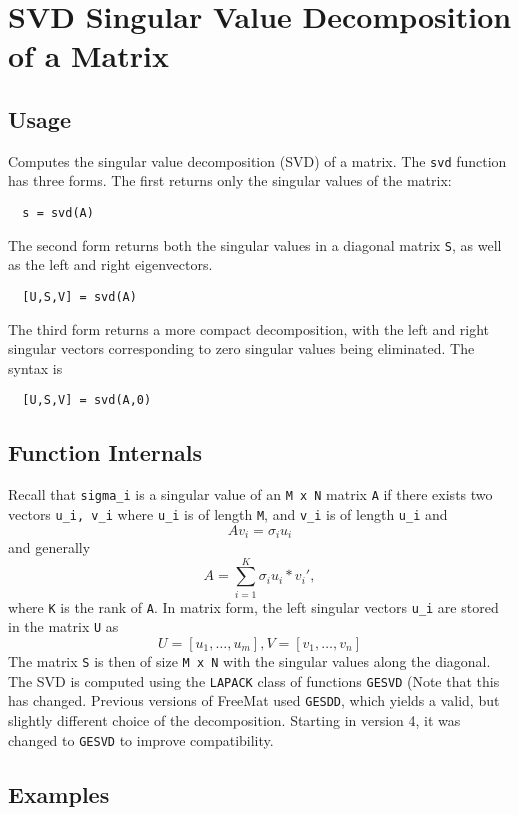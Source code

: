 \section{SVD Singular Value Decomposition of a Matrix}

\subsection{Usage}

Computes the singular value decomposition (SVD) of a matrix.  The 
\verb|svd| function has three forms.  The first returns only the singular
values of the matrix:
\begin{verbatim}
  s = svd(A)
\end{verbatim}
The second form returns both the singular values in a diagonal
matrix \verb|S|, as well as the left and right eigenvectors.
\begin{verbatim}
  [U,S,V] = svd(A)
\end{verbatim}
The third form returns a more compact decomposition, with the
left and right singular vectors corresponding to zero singular
values being eliminated.  The syntax is
\begin{verbatim}
  [U,S,V] = svd(A,0)
\end{verbatim}
\subsection{Function Internals}

Recall that \verb|sigma_i| is a singular value of an \verb|M x N|
matrix \verb|A| if there exists two vectors \verb|u_i, v_i| where \verb|u_i| is
of length \verb|M|, and \verb|v_i| is of length \verb|u_i| and
\[
  A v_i = \sigma_i u_i
\]
and generally
\[
  A = \sum_{i=1}^{K} \sigma_i u_i*v_i',
\]
where \verb|K| is the rank of \verb|A|.  In matrix form, the left singular
vectors \verb|u_i| are stored in the matrix \verb|U| as
\[
  U = [u_1,\ldots,u_m], V = [v_1,\ldots,v_n]
\]
The matrix \verb|S| is then of size \verb|M x N| with the singular
values along the diagonal.  The SVD is computed using the 
\verb|LAPACK| class of functions \verb|GESVD| (Note that this has
changed.  Previous versions of FreeMat used \verb|GESDD|, which
yields a valid, but slightly different choice of the decomposition.
Starting in version 4, it was changed to \verb|GESVD| to improve
compatibility.
\subsection{Examples}

